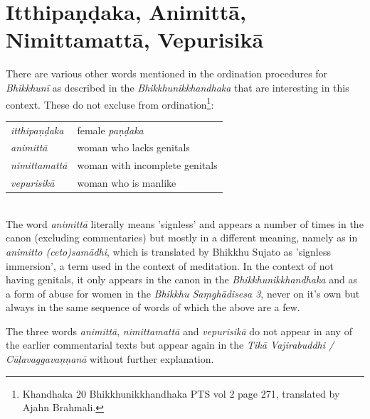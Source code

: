 \section{Itthipaṇḍaka, Animittā, Nimittamattā, Vepurisikā}

There are various other words mentioned in the ordination procedures for {\em Bhikkhunī} as described in the {\em Bhikkhunikkhandhaka} that are interesting in this context. These do not excluse from ordination\footnote{Khandhaka 20 Bhikkhunikkhandhaka PTS vol 2 page 271, translated by Ajahn Brahmali.}: \\

\begin{tabular}{ l l }
 {\em itthipaṇḍaka} & female {\em paṇḍaka} \\
 {\em animittā } & woman who lacks genitals \\
 {\em nimittamattā } & woman with incomplete genitals \\ 
 {\em vepurisikā } & woman who is manlike \\
\end{tabular} \\

The word {\em animittā} literally means 'signless' and appears a number of times in the canon (excluding commentaries) but mostly in a different meaning, namely as in {\em animitto (ceto)samādhi}, which is translated by Bhikkhu Sujato as 'signless immersion', a term used in the context of meditation. In the context of not having genitals, it only appears in the canon in the {\em Bhikkhunikkhandhaka} and as a form of abuse for women in the {\em Bhikkhu Saṃ­ghā­di­sesa­ 3}, never on it's own but always in the same sequence of words of which the above are a few.

The three words  {\em animittā}, {\em nimittamattā} and {\em vepurisikā} do not appear in any of the earlier commentarial texts but appear again in the {\em Tikā Vajirabuddhi / Cūḷavaggavaṇṇanā} without further explanation.

